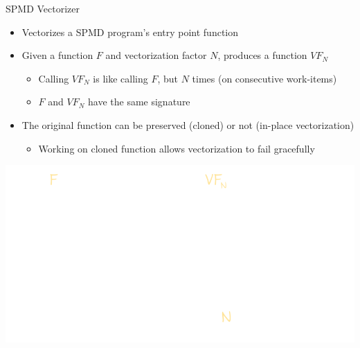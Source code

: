 \begin{frame}{SPMD Vectorizer}

\begin{minipage}[t]{0.45\linewidth}

\begin{itemize}
    \item Vectorizes a SPMD program's entry point function
    \item Given a function $F$ and vectorization factor $N$, produces a function $VF_N$
    \begin{itemize}
        \item Calling $VF_N$ is like calling $F$, but $N$ times (on consecutive work-items)
        \item $F$ and $VF_N$ have the same signature
    \end{itemize}
    
    \item The original function can be preserved (cloned) or not (in-place vectorization)
    \begin{itemize}
        \item Working on cloned function allows vectorization to fail gracefully
    \end{itemize}
    
\end{itemize}

\end{minipage}
\hspace{1em}
\begin{minipage}[t]{0.48\linewidth}

\vspace{-0.1ex}
\begin{tcolorbox}
\includegraphics[width=\textwidth]{images/F-vs-VFn.pdf}
\end{tcolorbox}

\end{minipage}

\end{frame}

